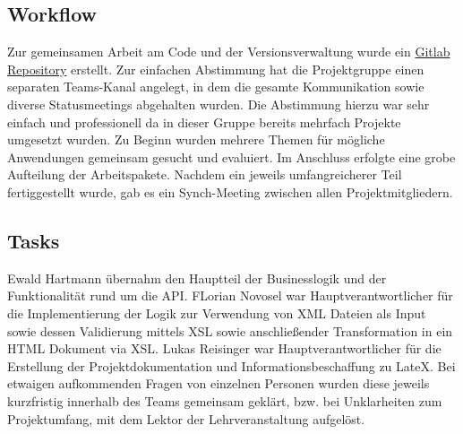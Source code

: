 \documentclass[a4paper]{article}
\begin{document}
\subsection{Workflow}
Zur gemeinsamen Arbeit am Code und der Versionsverwaltung wurde ein \href{https://gitlab.com/Scrolls8010/mul_projekt_grp_3}{Gitlab Repository} erstellt. Zur einfachen Abstimmung hat die Projektgruppe einen separaten Teams-Kanal angelegt, in dem die gesamte Kommunikation sowie diverse Statusmeetings abgehalten wurden. Die Abstimmung hierzu war sehr einfach und professionell da in dieser Gruppe bereits mehrfach Projekte umgesetzt wurden. Zu Beginn wurden mehrere Themen für mögliche Anwendungen gemeinsam gesucht und evaluiert. Im Anschluss erfolgte eine grobe Aufteilung der Arbeitspakete. Nachdem ein jeweils umfangreicherer Teil fertiggestellt wurde, gab es ein Synch-Meeting zwischen allen Projektmitgliedern.

\subsection{Tasks}
Ewald Hartmann übernahm den Hauptteil der Businesslogik und der Funktionalität rund um die API. FLorian Novosel war Hauptverantwortlicher für die Implementierung der Logik zur Verwendung von XML Dateien als Input sowie dessen Validierung mittels XSL sowie anschließender Transformation in ein HTML Dokument via XSL. Lukas Reisinger war Hauptverantwortlicher für die Erstellung der Projektdokumentation und Informationsbeschaffung zu LateX. Bei etwaigen aufkommenden Fragen von einzelnen Personen wurden diese jeweils kurzfristig innerhalb des Teams gemeinsam geklärt, bzw. bei Unklarheiten zum Projektumfang, mit dem Lektor der Lehrveranstaltung aufgelöst.
\end{document}
